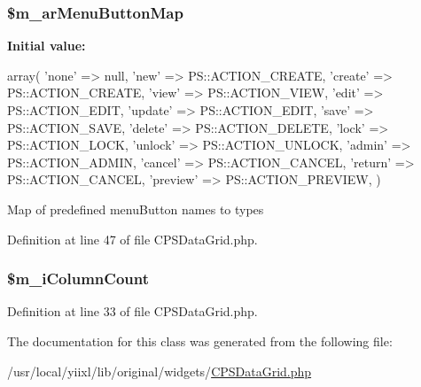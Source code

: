 \hypertarget{classCPSDataGrid_a36b298be9109a11d6fc986b36831f96f}{
\subsubsection[{\$m\_\-arMenuButtonMap}]{\setlength{\rightskip}{0pt plus 5cm}\$m\_\-arMenuButtonMap}}
\label{classCPSDataGrid_a36b298be9109a11d6fc986b36831f96f}
{\bfseries Initial value:}
\begin{DoxyCode}
 array(
        'none'      => null,
        'new'       => PS::ACTION_CREATE,
        'create'    => PS::ACTION_CREATE,
        'view'      => PS::ACTION_VIEW,
        'edit'      => PS::ACTION_EDIT,
        'update'    => PS::ACTION_EDIT,
        'save'      => PS::ACTION_SAVE,
        'delete'    => PS::ACTION_DELETE,
        'lock'      => PS::ACTION_LOCK,
        'unlock'    => PS::ACTION_UNLOCK,
        'admin'     => PS::ACTION_ADMIN,
        'cancel'    => PS::ACTION_CANCEL,
        'return'    => PS::ACTION_CANCEL,
        'preview'   => PS::ACTION_PREVIEW,
    )
\end{DoxyCode}
Map of predefined menuButton names to types 

Definition at line 47 of file CPSDataGrid.php.

\hypertarget{classCPSDataGrid_a1ee8c98e418359687d96dff41468fa61}{
\subsubsection[{\$m\_\-iColumnCount}]{\setlength{\rightskip}{0pt plus 5cm}\$m\_\-iColumnCount}}
\label{classCPSDataGrid_a1ee8c98e418359687d96dff41468fa61}


Definition at line 33 of file CPSDataGrid.php.



The documentation for this class was generated from the following file:\begin{DoxyCompactItemize}
\item 
/usr/local/yiixl/lib/original/widgets/\hyperlink{CPSDataGrid_8php}{CPSDataGrid.php}\end{DoxyCompactItemize}
